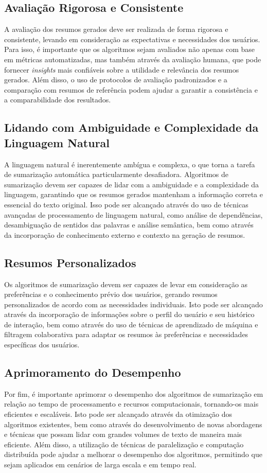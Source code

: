 \subsection{Avaliação Rigorosa e Consistente}
A avaliação dos resumos gerados deve ser realizada de forma rigorosa e 
consistente, levando em consideração as expectativas e necessidades dos 
usuários. Para isso, é importante que os algoritmos sejam avaliados não apenas 
com base em métricas automatizadas, mas também através da avaliação humana, que 
pode fornecer \textit{insights} mais confiáveis sobre a utilidade e relevância dos 
resumos gerados. Além disso, o uso de protocolos de avaliação padronizados e a 
comparação com resumos de referência podem ajudar a garantir a consistência e a 
comparabilidade dos resultados.

\subsection{Lidando com Ambiguidade e Complexidade da Linguagem Natural}
A linguagem natural é inerentemente ambígua e complexa, o que torna a tarefa de 
sumarização automática particularmente desafiadora. Algoritmos de sumarização 
devem ser capazes de lidar com a ambiguidade e a complexidade da linguagem, 
garantindo que os resumos gerados mantenham a informação correta e essencial do 
texto original. Isso pode ser alcançado através do uso de técnicas avançadas de 
processamento de linguagem natural, como análise de dependências, desambiguação 
de sentidos das palavras e análise semântica, bem como através da incorporação 
de conhecimento externo e contexto na geração de resumos.

\subsection{Resumos Personalizados}
Os algoritmos de sumarização devem ser capazes de levar em consideração as 
preferências e o conhecimento prévio dos usuários, gerando resumos 
personalizados de acordo com as necessidades individuais. Isto pode ser 
alcançado através da incorporação de informações sobre o perfil do usuário e seu 
histórico de interação, bem como através do uso de técnicas de aprendizado de 
máquina e filtragem colaborativa para adaptar os resumos às preferências e 
necessidades específicas dos usuários.

\subsection{Aprimoramento do Desempenho}
Por fim, é importante aprimorar o desempenho dos algoritmos de sumarização em 
relação ao tempo de processamento e recursos computacionais, tornando-os mais 
eficientes e escaláveis. Isto pode ser alcançado através da otimização dos 
algoritmos existentes, bem como através do desenvolvimento de novas abordagens e 
técnicas que possam lidar com grandes volumes de texto de maneira mais 
eficiente. Além disso, a utilização de técnicas de paralelização e computação 
distribuída pode ajudar a melhorar o desempenho dos algoritmos, permitindo que 
sejam aplicados em cenários de larga escala e em tempo real.

